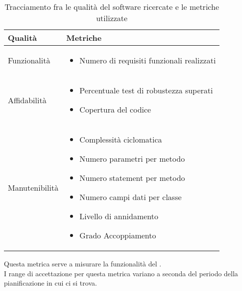 			\begin{table}[H]
			\begin{center}
			\begin{tabular}{ | m{4cm} | m{8cm} | } 
			\hline
			\textbf{Qualità} & \textbf{Metriche} \\ \hline

                        Funzionalità & \begin{itemize} \item Numero di requisiti funzionali realizzati \end{itemize} \\ \hline
                        Affidabilità & \begin{itemize}
                                 \item Percentuale test di robustezza superati
                                 \item Copertura del codice
                                \end{itemize} \\ \hline
                        Manutenibilità     & \begin{itemize}
                                    \item Complessità ciclomatica
                                    \item Numero parametri per metodo
                                    \item Numero statement per metodo
                                    \item Numero campi dati per classe
                                    \item Livello di annidamento
                                    \item Grado Accoppiamento
                                  \end{itemize}\\ \hline 
			\end{tabular}
			\end{center}
			\caption{Tracciamento fra le qualità del software ricercate e le metriche utilizzate}
			\end{table}
				 \label{subsec:numReqFunzionali}
					Questa metrica serve a misurare la funzionalità del . \\
					I range di accettazione per questa metrica variano a seconda del periodo della pianificazione in cui ci si trova.
